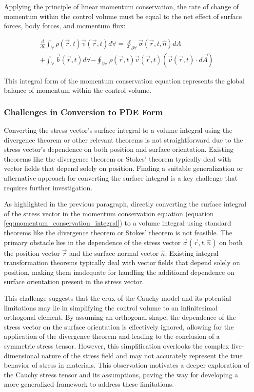 \documentclass[12pt,a4paper,english]{article}
\begin{document}
Applying the principle of linear momentum conservation, the rate of change of momentum within the control volume must be equal to the net effect of surface forces, body forces, and momentum flux:

\begin{equation}\label{eq:momentum_conservation_integral}
\begin{split}
\frac{d}{dt} \int_{\forall} \rho(\vec{r}, t) \vec{v}(\vec{r}, t) d\forall = \oint_{\partial \forall} \vec{\sigma}(\vec{r}, t, \hat{n}) dA \\
+ \int_{\forall} \vec{b}(\vec{r}, t) d\forall - \oint_{\partial \forall} \rho(\vec{r}, t) \vec{v}(\vec{r}, t) (\vec{v}(\vec{r}, t) \cdot d\vec{A})
\end{split}
\end{equation}

\noindent
This integral form of the momentum conservation equation represents the global balance of momentum within the control volume.

\subsubsection{Challenges in Conversion to PDE Form}

Converting the stress vector's surface integral to a volume integral using the divergence theorem or other relevant theorems is not straightforward due to the stress vector's dependence on both position and surface orientation. Existing theorems like the divergence theorem or Stokes' theorem typically deal with vector fields that depend solely on position. Finding a suitable generalization or alternative approach for converting the surface integral is a key challenge that requires further investigation.

As highlighted in the previous paragraph, directly converting the surface integral of the stress vector in the momentum conservation equation (equation \ref{eq:momentum_conservation_integral}) to a volume integral using standard theorems like the divergence theorem or Stokes' theorem is not feasible. The primary obstacle lies in the dependence of the stress vector $\vec{\sigma}(\vec{r}, t, \hat{n})$ on both the position vector $\vec{r}$ and the surface normal vector $\hat{n}$. Existing integral transformation theorems typically deal with vector fields that depend solely on position, making them inadequate for handling the additional dependence on surface orientation present in the stress vector.

This challenge suggests that the crux of the Cauchy model and its potential limitations may lie in simplifying the control volume to an infinitesimal orthogonal element. By assuming an orthogonal shape, the dependence of the stress vector on the surface orientation is effectively ignored, allowing for the application of the divergence theorem and leading to the conclusion of a symmetric stress tensor. However, this simplification overlooks the complex five-dimensional nature of the stress field and may not accurately represent the true behavior of stress in materials. This observation motivates a deeper exploration of the Cauchy stress tensor and its assumptions, paving the way for developing a more generalized framework to address these limitations.
\end{document}
